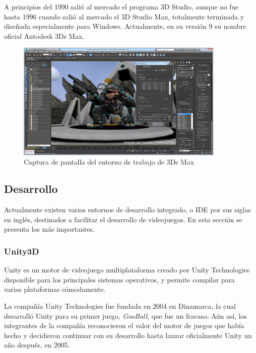 A principios del 1990 salió al mercado el programa 3D Studio, aunque no fue hasta 1996 cuando salió al mercado el 3D Studio Max, totalmente terminada y diseñada especialmente para Windows. Actualmente, en su versión 9 su nombre oficial Autodesk 3Ds Max.

\begin{figure}[!h]
\begin{center}
\includegraphics[width=0.9\textwidth]{imagenes/2/3ds-max.jpg}
\caption{Captura de pantalla del entorno de trabajo de 3Ds Max}
\label{fig:3ds-max}
\end{center}
\end{figure}

\subsection{Desarrollo}

Actualmente existen varios entornos de desarrollo integrado, o \acs{IDE} por sus siglas en inglés, destinados a facilitar el desarrollo de videojuegos. En esta sección se presenta los más importantes.

\subsubsection{Unity3D}

Unity es un motor de videojuego multiplataforma creado por Unity Technologies disponible para los principales sistemas operativos, y permite compilar para varias plataformas cómodamente. 

La compañía Unity Technologies fue fundada en 2004 en Dinamarca, la cual desarrolló Unity para su primer juego, \textit{GooBall}, que fue un fracaso. Aún así, los integrantes de la compañía reconocieron el valor del motor de juegos que había hecho y decidieron continuar con su desarrollo hasta lanzar oficialmente Unity un año después, en 2005.  

